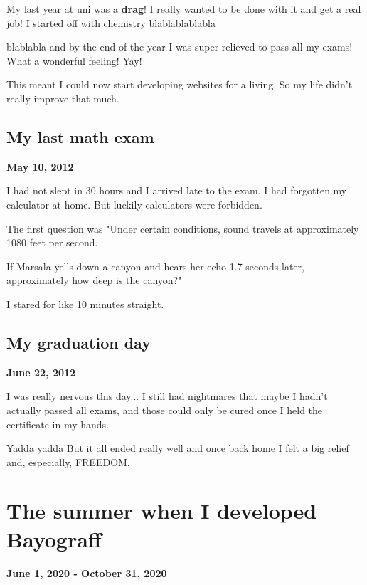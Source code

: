 \documentclass[12pt, a4paper]{article}
\begin{document}
My last year at uni was a \textbf{drag}! I really wanted to be done with it and get a \underline{real job}! I started off with chemistry blablablablabla

blablabla and by the end of the year I was super relieved to pass all my exams! What a wonderful feeling! Yay!

This meant I could now start developing websites for a living. So my life didn't really improve that much.

\subsection{My last math exam}
\begin{center}
\textbf{May 10, 2012}
\end{center}
\vspace{3mm}

I had not slept in 30 hours and I arrived late to the exam. I had forgotten my calculator at home. But luckily calculators were forbidden.

The first question was "Under certain conditions, sound travels at approximately 1080 feet per second.

If Marsala yells down a canyon and hears her echo 1.7 seconds later, approximately how deep is the canyon?"

I stared for like 10 minutes straight.

\subsection{My graduation day}
\begin{center}
\textbf{June 22, 2012}
\end{center}
\vspace{3mm}

I was really nervous this day... I still had nightmares that maybe I hadn't actually passed all exams, and those could only be cured once I held the certificate in my hands.

Yadda yadda But it all ended really well and once back home I felt a big relief and, especially, FREEDOM.

\section{The summer when I developed Bayograff}
\begin{center}
\textbf{June 1, 2020 - October 31, 2020}
\end{center}
\vspace{3mm}
\end{document}
